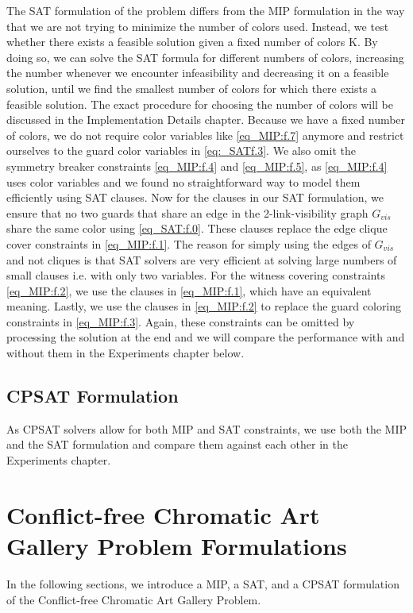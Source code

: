 The SAT formulation of the problem differs from the MIP formulation in the way that we are not trying to minimize the number of colors used. Instead, we test whether there exists a feasible solution given a fixed number of colors K. By doing so, we can solve the SAT formula for different numbers of colors, increasing the number whenever we encounter infeasibility and decreasing it on a feasible solution, until we find the smallest number of colors for which there exists a feasible solution. The exact procedure for choosing the number of colors will be discussed in the Implementation Details chapter. Because we have a fixed number of colors, we do not require color variables like \cref{eq_MIP:f.7} anymore and restrict ourselves to the guard color variables in \cref{eq:_SATf.3}. We also omit the symmetry breaker constraints \cref{eq_MIP:f.4} and \cref{eq_MIP:f.5}, as \cref{eq_MIP:f.4} uses color variables and we found no straightforward way to model them efficiently using SAT clauses. Now for the clauses in our SAT formulation, we ensure that no two guards that share an edge in the 2-link-visibility graph $G_{vis}$ share the same color using \cref{eq_SAT:f.0}. These clauses replace the edge clique cover constraints in \cref{eq_MIP:f.1}. The reason for simply using the edges of $G_{vis}$ and not cliques is that SAT solvers are very efficient at solving large numbers of small clauses i.e. with only two variables. For the witness covering constraints \cref{eq_MIP:f.2}, we use the clauses in \cref{eq_MIP:f.1}, which have an equivalent meaning. Lastly, we use the clauses in \cref{eq_MIP:f.2} to replace the guard coloring constraints in \cref{eq_MIP:f.3}. Again, these constraints can be omitted by processing the solution at the end and we will compare the performance with and without them in the Experiments chapter below.

\section{CPSAT Formulation}

As CPSAT solvers allow for both MIP and SAT constraints, we use both the MIP and the SAT formulation and compare them against each other in the Experiments chapter.

\chapter{Conflict-free Chromatic Art Gallery Problem Formulations}

In the following sections, we introduce a MIP, a SAT, and a CPSAT formulation of the Conflict-free Chromatic Art Gallery Problem.

